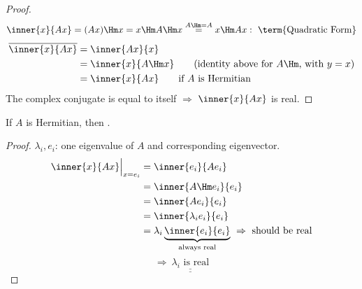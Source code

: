 \begin{proof}[Proof]
\[
\inner{x}{Ax}=(Ax)\Hm x=x\Hm A\Hm x\overset{A\Hm=A}{=}x\Hm Ax:\ \text{\term{Quadratic Form}}
\]
\begin{align*}
\overline{\inner{x}{Ax}}&=\inner{Ax}{x}\\
&=\inner{x}{A\Hm x}\qquad\text{(identity above for $A\Hm$, with $y=x$)}\\
&=\inner{x}{Ax}\qquad\text{if $A$ is Hermitian}
\end{align*}
The complex conjugate is equal to itself $\Rightarrow$ $\inner{x}{Ax}$ is real.
\end{proof}

\begin{theorem}
\leavevmode{}If $A$ is Hermitian, then .
\end{theorem}
\begin{proof}[Proof]
$\lambda_i, e_i$: one eigenvalue of $A$ and corresponding eigenvector.
\begin{align*}
\inner{x}{Ax}\Big|_{x=e_i}&=\inner{e_i}{Ae_i}\\
&=\inner{A\Hm e_i}{e_i}\\
&=\inner{Ae_i}{e_i}\\
&=\inner{\lambda_ie_i}{e_i}\\
&=\lambda_i\underbrace{\inner{e_i}{e_i}}_{\text{always real}}\ \Rightarrow\ \text{should be real}
\end{align*}
\[
\Rightarrow\ \underline{\underline{\lambda_i\text{ is real}}}
\]
\end{proof}

